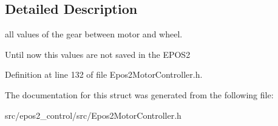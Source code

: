 \subsection{Detailed Description}
all values of the gear between motor and wheel. 

Until now this values are not saved in the E\-P\-O\-S2 

Definition at line 132 of file Epos2\-Motor\-Controller.\-h.



The documentation for this struct was generated from the following file\-:\begin{DoxyCompactItemize}
\item 
src/epos2\-\_\-control/src/Epos2\-Motor\-Controller.\-h\end{DoxyCompactItemize}
